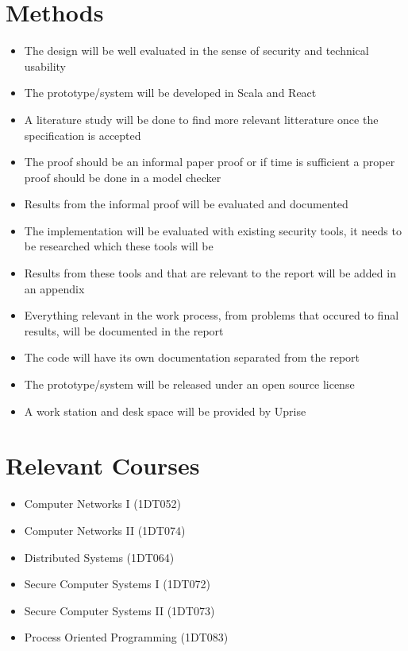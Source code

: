 \documentclass[a4paper,12pt]{article}
\begin{document}
\newpage
\section{Methods}
\begin{itemize}
  \item The design will be well evaluated in the sense of security and technical usability
  \item The prototype/system will be developed in Scala and React
  \item A literature study will be done to find more relevant litterature once the specification is accepted 
  \item The proof should be an informal paper proof or if time is sufficient a proper proof should be done in a model checker
  \item Results from the informal proof will be evaluated and documented
  \item The implementation will be evaluated with existing security tools, it needs to be researched which these tools will be
      \item Results from these tools and that are relevant to the report will be added in an appendix
  \item Everything relevant in the work process, from problems that occured to final results, will be documented in the report
  \item The code will have its own documentation separated from the report 
  \item The prototype/system will be released under an open source license
  \item A work station and desk space will be provided by Uprise
\end{itemize}

\section{Relevant Courses}
\begin{itemize}
  \item Computer Networks I (1DT052)
  \item Computer Networks II (1DT074)
  \item Distributed Systems (1DT064)
  \item Secure Computer Systems I (1DT072)
  \item Secure Computer Systems II (1DT073)
  \item Process Oriented Programming (1DT083)
\end{itemize}
\end{document}
